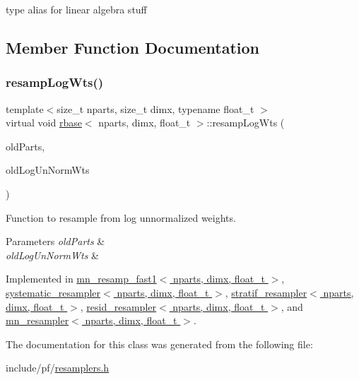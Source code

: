 type alias for linear algebra stuff 

\subsection{Member Function Documentation}
\mbox{\label{classrbase_aff0f6f88fd4656e67f5ebc870f10dd44}} 
\subsubsection{\texorpdfstring{resamp\+Log\+Wts()}{resampLogWts()}}
{\footnotesize\ttfamily template$<$size\+\_\+t nparts, size\+\_\+t dimx, typename float\+\_\+t $>$ \\
virtual void \hyperlink{classrbase}{rbase}$<$ nparts, dimx, float\+\_\+t $>$\+::resamp\+Log\+Wts (\begin{DoxyParamCaption}\item[{\hyperlink{classrbase_aa12fc826befa6ba0647b5f59ebc396ee}{array\+Vec} \&}]{old\+Parts,  }\item[{\hyperlink{classrbase_a6f76bef853e508cb5b6f546d231b06f5}{array\+Float} \&}]{old\+Log\+Un\+Norm\+Wts }\end{DoxyParamCaption})\hspace{0.3cm}{\ttfamily [pure virtual]}}



Function to resample from log unnormalized weights. 


\begin{DoxyParams}{Parameters}
{\em old\+Parts} & \\
\hline
{\em old\+Log\+Un\+Norm\+Wts} & \\
\hline
\end{DoxyParams}


Implemented in \hyperlink{classmn__resamp__fast1_a398e64faa29bafd345c0258ca90d489c}{mn\+\_\+resamp\+\_\+fast1$<$ nparts, dimx, float\+\_\+t $>$}, \hyperlink{classsystematic__resampler_a9467aec6002043f35f40e9e4857021ed}{systematic\+\_\+resampler$<$ nparts, dimx, float\+\_\+t $>$}, \hyperlink{classstratif__resampler_a2588147563bf3fe598e262cae7e125e6}{stratif\+\_\+resampler$<$ nparts, dimx, float\+\_\+t $>$}, \hyperlink{classresid__resampler_ae6957cd1e080ac4313e6b0bc5ae9aa96}{resid\+\_\+resampler$<$ nparts, dimx, float\+\_\+t $>$}, and \hyperlink{classmn__resampler_a13b1897e180a791a3a099d5d6329a125}{mn\+\_\+resampler$<$ nparts, dimx, float\+\_\+t $>$}.



The documentation for this class was generated from the following file\+:\begin{DoxyCompactItemize}
\item 
include/pf/\hyperlink{resamplers_8h}{resamplers.\+h}\end{DoxyCompactItemize}
